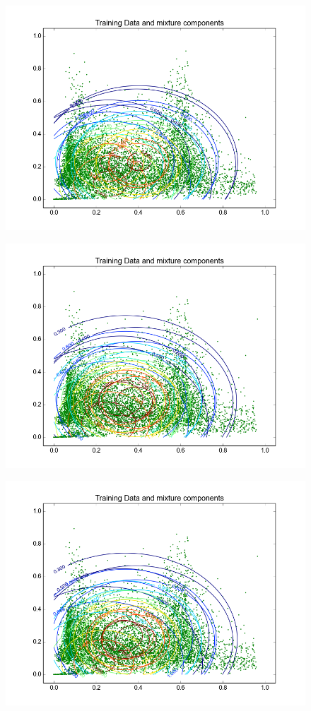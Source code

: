 \documentclass[11pt,a4paper]{article}
\begin{document}
\begin{minipage}[b]{0.25\textwidth}
\begin{figure}[H]
  \centering
  \includegraphics[width=.8\linewidth]{Figures/contours_diagstreet0.png}
\end{figure}%
\end{minipage}
\begin{minipage}[b]{0.25\textwidth}
\begin{figure}[H]
  \centering
  \includegraphics[width=.8\linewidth]{Figures/contours_diagstreet5.png}

  \label{fig:sfig1}
\end{figure}%
\end{minipage}
\begin{minipage}[b]{0.25\textwidth}
\begin{figure}[H]
  \centering
  \includegraphics[width=.8\linewidth]{Figures/contours_diagstreet15.png}

  \label{fig:sfig1}
\end{figure}%
\end{minipage}
\end{document}
